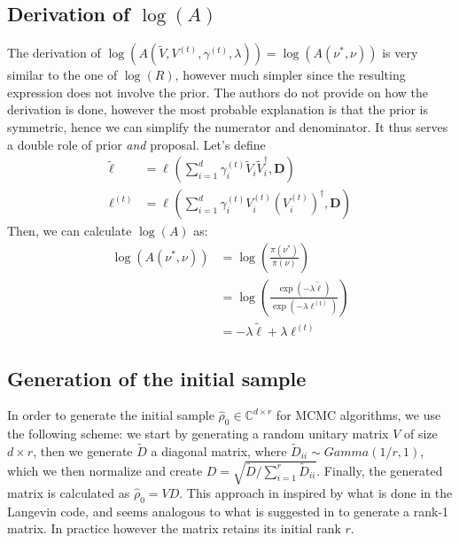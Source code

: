 \documentclass[12pt]{memoir}
\newcommand{\mb}{\mathbf}
\begin{document}
\subsection*{Derivation of $\log(A)$}
The derivation of $\log(A(\tilde V, V^{(t)}, \gamma^{(t)}, \lambda)) = \log(A(\nu^*, \nu))$ is very similar to the one of $\log(R)$, however much simpler since the resulting expression does not involve the prior. The authors do not provide on how the derivation is done, however the most probable explanation is that the prior is symmetric, hence we can simplify the numerator and denominator. It thus serves a double role of prior \textit{and} proposal. Let's define
\begin{align}
    \tilde \ell &= \ell^{}(\sum_{i=1}^{d} \gamma_i^{(t)} \tilde V_i \tilde V_i^\dagger, \mb D)\\
    \ell^{(t)} &= \ell^{}(\sum_{i=1}^{d} \gamma_i^{(t)} V_i^{(t)} (V_i^{(t)})^\dagger, \mb D)
\end{align}
Then, we can calculate $\log(A)$ as:
\begin{align}
    \log(A(\nu^*, \nu)) &= \log(\frac{\pi(\nu^*)} {\pi(\nu) })\\
                        &= \log(\frac{\exp(-\lambda \tilde \ell)}{\exp(-\lambda \ell^{(t)})})\\
                        &= -\lambda \tilde \ell + \lambda \ell^{(t)}
\end{align}

\subsection*{Generation of the initial sample}\label{section:init-sample-gen}
In order to generate the initial sample $\hat \rho_0 \in \mathbb{C}^{d\times r}$ for MCMC algorithms, we use the following scheme: we start by generating a random unitary matrix $V$ of size $d \times r$, then we generate $\tilde D$ a diagonal matrix, where $\tilde D_{ii} \sim Gamma(1/r, 1)$, which we then normalize and create $D = \sqrt{\tilde D/\sum_{i=1}^{r} \tilde D_{ii}}$. Finally, the generated matrix is calculated as $\hat \rho_0 = V D$. This approach in inspired by what is done in the Langevin code, and seems analogous to what is suggested in \cite{MA17} to generate a rank-1 matrix. In practice however the matrix retains its initial rank $r$.

\end{document}
